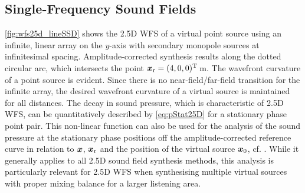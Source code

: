 \subsection{Single-Frequency Sound Fields}

\myfig\ref{fig:wfs25d_lineSSD} shows the 2.5D WFS of a virtual point source
using an infinite, linear array on the $y$-axis with secondary monopole sources
at infinitesimal spacing.
%
Amplitude-corrected synthesis results along the dotted circular arc,
which intersects the point $\bm{x}_\mathrm{r} = (4,0,0)^\mathrm{T}$\,m.
%
The wavefront curvature of a point source
is evident.
%
Since there is no near-field/far-field transition for the infinite
array, the desired wavefront curvature of a virtual source is
maintained for all distances.
%
The decay in sound pressure, which is characteristic of 2.5D WFS, can be
quantitatively described by \eqref{eq:pStat25D}
for a stationary phase point pair.
%
This non-linear function can also be used for the analysis of the sound
pressure at the stationary phase positions off the amplitude-corrected
reference curve in relation to $\bm{x}$, $\bm{x}_\mathrm{r}$ and the position of
the virtual source $\bm{x}_\mathrm{0}$,
cf. \cite{Sonke2000_diss,Wittek2007_diss,Spors2010a}.
%
While it generally applies to all 2.5D sound field synthesis methods,
this analysis is particularly relevant for 2.5D WFS when synthesising
multiple virtual sources with proper mixing balance for a larger listening area.



